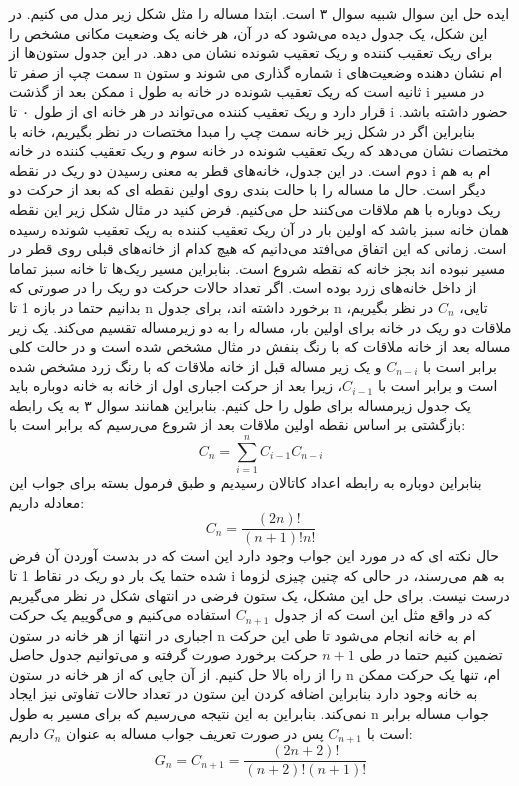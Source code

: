 \p
            ایده حل این سوال شبیه سوال ۳ است. ابتدا مساله را مثل شکل زیر مدل می کنیم. در این شکل، یک جدول دیده می‌شود که در آن، هر خانه یک وضعیت مکانی مشخص را برای ریک تعقیب کننده و ریک تعقیب شونده نشان می دهد. در این جدول ستون‌ها از سمت چپ از صفر تا n شماره گذاری می شوند و ستون i ام نشان دهنده وضعیت‌های ممکن بعد از گذشت i ثانیه است که ریک تعقیب شونده در خانه به طول i در مسیر قرار دارد و ریک تعقیب کننده می‌تواند در هر خانه ای از طول ۰ تا i حضور داشته باشد. بنابراین اگر در شکل زیر خانه سمت چپ را مبدا مختصات در نظر بگیریم، خانه با مختصات  نشان می‌دهد که ریک تعقیب شونده در خانه سوم و ریک تعقیب کننده در خانه دوم است. در این جدول، خانه‌های قطر  به معنی رسیدن دو ریک در نقطه i ام به هم دیگر است. حال ما مساله را با حالت بندی روی اولین نقطه ای که بعد از حرکت دو ریک دوباره با هم ملاقات می‌کنند حل می‌کنیم. فرض کنید در مثال شکل زیر این نقطه همان خانه سبز باشد که اولین بار در آن ریک تعقیب کننده به ریک تعقیب شونده رسیده است. زمانی که این اتفاق می‌افتد می‌دانیم که هیچ کدام از خانه‌های قبلی روی قطر در مسیر نبوده اند بجز خانه  که نقطه شروع است. بنابراین مسیر ریک‌ها تا خانه سبز‌ تماما از داخل خانه‌های زرد بوده است. اگر تعداد حالات حرکت دو ریک را در صورتی که بدانیم حتما در بازه 1 تا n برخورد داشته اند، برای جدول n تایی، \( C_n \) در نظر بگیریم، ملاقات دو ریک در خانه  برای اولین بار، مساله را به دو زیرمساله تقسیم می‌کند. یک زیر مساله بعد از خانه ملاقات که با رنگ بنفش در مثال مشخص شده است و در حالت کلی برابر است با \( C_{n-i} \) و یک زیر مساله قبل از خانه ملاقات که با رنگ زرد مشخص شده است و برابر است با \( C_{i-1} \)، زیرا بعد از حرکت اجباری اول از خانه  به خانه  دوباره باید یک جدول زیرمساله برای طول  را حل کنیم. بنابراین همانند سوال ۳ به یک رابطه بازگشتی بر اساس نقطه اولین ملاقات بعد از شروع می‌رسیم که برابر است با:
            \[ C_n = \sum\limits_{i=1}^{n} C_{i-1}C_{n-i} \]بنابراین دوباره به رابطه اعداد کاتالان رسیدیم و طبق فرمول بسته برای جواب این معادله داریم:
            \[ C_n = \frac{(2n)!}{(n+1)!n!} \]حال نکته ای که در مورد این جواب وجود دارد این است که در بدست آوردن آن فرض شده حتما یک بار دو ریک در نقاط 1 تا i به هم می‌رسند، در حالی که چنین چیزی لزوما درست نیست. برای حل این مشکل، یک ستون فرضی در انتهای شکل در نظر می‌گیریم که در واقع مثل این است که از جدول \( C_{n+1} \) استفاده می‌کنیم و می‌گوییم یک حرکت اجباری در انتها از هر خانه در ستون n ام به خانه  انجام می‌شود تا طی این حرکت تضمین کنیم حتما در طی \( n+1 \) حرکت برخورد صورت گرفته و می‌توانیم جدول حاصل را از راه بالا حل کنیم. از آن جایی که از هر خانه در ستون n ام، تنها یک حرکت ممکن به خانه  وجود دارد بنابراین اضافه کردن این ستون در تعداد حالات تفاوتی نیز ایجاد نمی‌کند. بنابراین به این نتیجه می‌رسیم که برای مسیر به طول n جواب مساله برابر است با \( C_{n+1} \) پس در صورت تعریف جواب مساله به عنوان \( G_n \) داریم:
            \[ G_n = C_{n+1} = \frac{(2n+2)!}{(n+2)!(n+1)!} \]
            \p 
